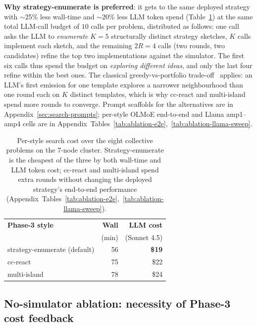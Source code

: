 \textbf{Why strategy-enumerate is preferred}: it gets to the same
deployed strategy with $\sim$25\% less wall-time and $\sim$20\%
less LLM token spend (Table~\ref{tab:ablation-cost}) at the same
total LLM-call budget of $10$ calls per problem, distributed as
follows: one call asks the LLM to \emph{enumerate} $K{=}5$
structurally distinct strategy sketches, $K$ calls implement each
sketch, and the remaining $2R{=}4$ calls (two rounds, two
candidates) refine the top two implementations against the
simulator. The first six calls thus spend the budget on
\emph{exploring different ideas}, and only the last four refine
within the best ones. The classical greedy-vs-portfolio
trade-off~\cite{kocsis2006ucb, russell2010ai} applies: an LLM's
first emission for one template explores a narrower neighbourhood
than one round each on $K$ distinct templates, which is why
cc-react and multi-island spend more rounds to converge. Prompt
scaffolds for the alternatives are in
Appendix~\ref{sec:search-prompts}; per-style OLMoE end-to-end
and Llama amp1--amp4 cells are in
Appendix~Tables~\ref{tab:ablation-e2e},~\ref{tab:ablation-llama-sweep}.

\begin{table}[!htbp]
\centering\small
\setlength{\tabcolsep}{4pt}
\begin{tabular}{lrr}
\toprule
\textbf{Phase-3 style} & \textbf{Wall} & \textbf{LLM cost} \\
                       & (min) & (Sonnet 4.5) \\
\midrule
strategy-enumerate (default) & 56 & \textbf{\$19} \\
cc-react                     & 75 & \$22 \\
multi-island                 & 78 & \$24 \\
\bottomrule
\end{tabular}
\caption{Per-style search cost over the eight collective problems
on the 7-node cluster. Strategy-enumerate is the cheapest of the
three by both wall-time and LLM token cost; cc-react and
multi-island spend extra rounds without changing the deployed
strategy's end-to-end performance
(Appendix~Tables~\ref{tab:ablation-e2e},~\ref{tab:ablation-llama-sweep}).}
\label{tab:ablation-cost}
\end{table}

\subsection{No-simulator ablation: necessity of Phase-3 cost feedback}
\label{sec:ablation-nosim}


